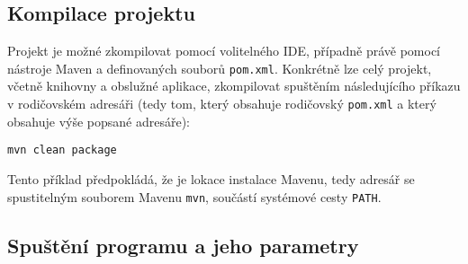 \subsection{Kompilace projektu}
Projekt je možné zkompilovat pomocí volitelného IDE, případně právě pomocí nástroje Maven a definovaných souborů \texttt{pom.xml}. Konkrétně lze celý projekt, včetně knihovny a obslužné aplikace, zkompilovat spuštěním následujícího příkazu v rodičovském adresáři (tedy tom, který obsahuje rodičovský \texttt{pom.xml} a který obsahuje výše popsané adresáře):

\begin{lstlisting}[frame={single}]
mvn clean package
\end{lstlisting}

Tento příklad předpokládá, že je lokace instalace Mavenu, tedy adresář se spustitelným souborem Mavenu \texttt{mvn}, součástí systémové cesty \texttt{PATH}.

\subsection{Spuštění programu a jeho parametry}